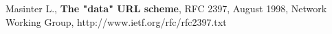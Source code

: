 \begin{thebibliography}{9}
Masinter L., \textbf{The "data" URL scheme}, RFC 2397, August 1998,
Network Working Group, http://www.ietf.org/rfc/rfc2397.txt
\end{thebibliography}
